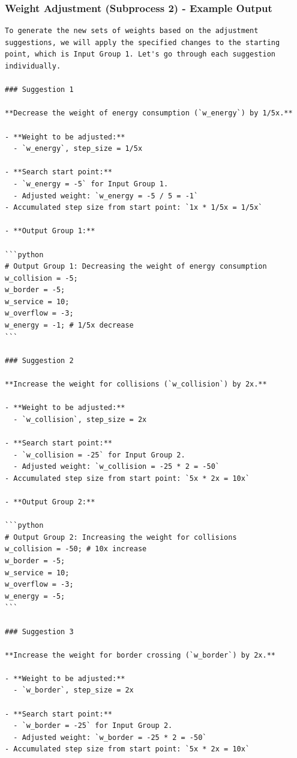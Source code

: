 \documentclass{article}
\begin{document}
\subsubsection{Weight Adjustment (Subprocess 2) - Example Output}

\begin{verbatim}
To generate the new sets of weights based on the adjustment suggestions, we will apply the specified changes to the starting point, which is Input Group 1. Let's go through each suggestion individually.

### Suggestion 1

**Decrease the weight of energy consumption (`w_energy`) by 1/5x.**

- **Weight to be adjusted:**
  - `w_energy`, step_size = 1/5x

- **Search start point:** 
  - `w_energy = -5` for Input Group 1.
  - Adjusted weight: `w_energy = -5 / 5 = -1`
- Accumulated step size from start point: `1x * 1/5x = 1/5x`
  
- **Output Group 1:**

```python
# Output Group 1: Decreasing the weight of energy consumption
w_collision = -5;
w_border = -5;
w_service = 10;
w_overflow = -3;
w_energy = -1; # 1/5x decrease
```

### Suggestion 2

**Increase the weight for collisions (`w_collision`) by 2x.**

- **Weight to be adjusted:**
  - `w_collision`, step_size = 2x

- **Search start point:** 
  - `w_collision = -25` for Input Group 2.
  - Adjusted weight: `w_collision = -25 * 2 = -50`
- Accumulated step size from start point: `5x * 2x = 10x`
  
- **Output Group 2:**

```python
# Output Group 2: Increasing the weight for collisions
w_collision = -50; # 10x increase
w_border = -5;
w_service = 10;
w_overflow = -3;
w_energy = -5;
```

### Suggestion 3

**Increase the weight for border crossing (`w_border`) by 2x.**

- **Weight to be adjusted:**
  - `w_border`, step_size = 2x

- **Search start point:** 
  - `w_border = -25` for Input Group 2.
  - Adjusted weight: `w_border = -25 * 2 = -50`
- Accumulated step size from start point: `5x * 2x = 10x`
  

\end{verbatim}
\end{document}
